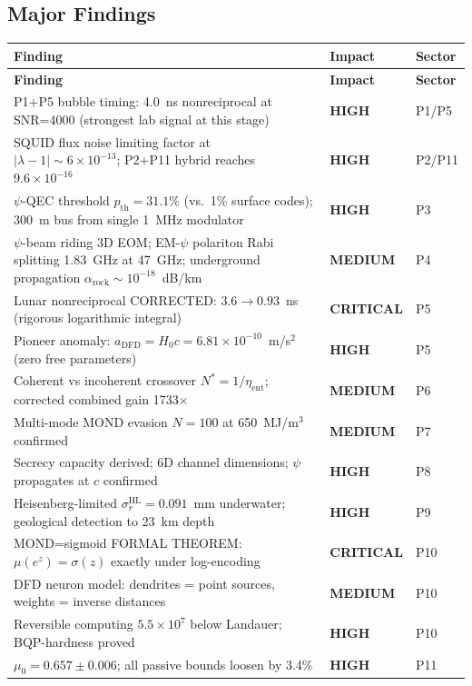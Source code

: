 \documentclass[11pt,a4paper]{article}
\newcommand{\CRITICAL}{\textcolor{critical}{\textbf{CRITICAL}}}
\newcommand{\HIGH}{\textcolor{high}{\textbf{HIGH}}}
\newcommand{\MEDIUM}{\textcolor{medium}{\textbf{MEDIUM}}}
\begin{document}
\subsection{Major Findings}

\begin{longtable}{p{}p{}p{}}
\toprule
\textbf{Finding} & \textbf{Impact} & \textbf{Sector} \\
\midrule
\endfirsthead
\midrule
\textbf{Finding} & \textbf{Impact} & \textbf{Sector} \\
\midrule
\endhead
P1+P5 bubble timing: 4.0~ns nonreciprocal at SNR=4000 (strongest lab signal at this stage) & \HIGH & P1/P5 \\
SQUID flux noise limiting factor at $|\lambda-1|\sim6\times10^{-13}$; P2+P11 hybrid reaches $9.6\times10^{-16}$ & \HIGH & P2/P11 \\
$\psi$-QEC threshold $p_\mathrm{th}=31.1\%$ (vs.\ 1\% surface codes); 300~m bus from single 1~MHz modulator & \HIGH & P3 \\
$\psi$-beam riding 3D EOM; EM-$\psi$ polariton Rabi splitting 1.83~GHz at 47~GHz; underground propagation $\alpha_\mathrm{rock}\sim10^{-18}$~dB/km & \MEDIUM & P4 \\
Lunar nonreciprocal CORRECTED: $3.6\to0.93$~ns (rigorous logarithmic integral) & \CRITICAL & P5 \\
Pioneer anomaly: $a_\mathrm{DFD}=H_0 c=6.81\times10^{-10}$~m/s$^2$ (zero free parameters) & \HIGH & P5 \\
Coherent vs incoherent crossover $N^*=1/\eta_\mathrm{ent}$; corrected combined gain 1733$\times$ & \MEDIUM & P6 \\
Multi-mode MOND evasion $N=100$ at 650~MJ/m$^3$ confirmed & \MEDIUM & P7 \\
Secrecy capacity derived; 6D channel dimensions; $\psi$ propagates at $c$ confirmed & \HIGH & P8 \\
Heisenberg-limited $\sigma_r^\mathrm{HL}=0.091$~mm underwater; geological detection to 23~km depth & \HIGH & P9 \\
MOND=sigmoid FORMAL THEOREM: $\mu(e^z)=\sigma(z)$ exactly under log-encoding & \CRITICAL & P10 \\
DFD neuron model: dendrites = point sources, weights = inverse distances & \MEDIUM & P10 \\
Reversible computing $5.5\times10^7$ below Landauer; BQP-hardness proved & \HIGH & P10 \\
$\mu_0 = 0.657\pm0.006$; all passive bounds loosen by 3.4\% & \HIGH & P11 \\

\end{longtable}
\end{document}
